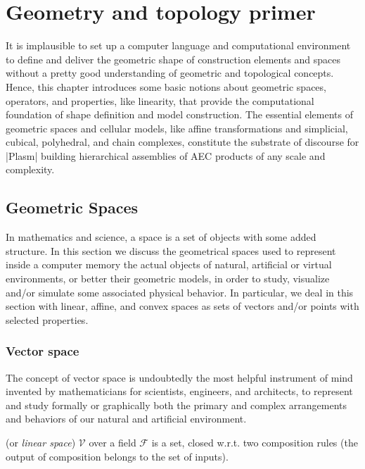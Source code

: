 
\chapter{Geometry and topology primer}
\label{chapt:3}

It is implausible to set up a computer language and computational environment to define and deliver the geometric shape of construction elements and spaces without a pretty good understanding of geometric and topological concepts. Hence, this chapter introduces some basic notions about geometric spaces, operators, and properties, like linearity, that provide the computational foundation of shape definition and model construction.
The essential elements of geometric spaces and cellular models, like affine transformations and simplicial, cubical, polyhedral, and chain complexes, constitute the substrate of discourse for |Plasm| building hierarchical assemblies of AEC products of any scale and complexity.

\section{Geometric Spaces}\label{chapt:3-1}


In mathematics and science, a space is a set of objects with some added structure.
In this section we discuss the geometrical spaces used to represent inside a computer memory the actual objects of natural, artificial or virtual environments, or better their geometric models, in order to study, visualize and/or simulate some associated physical behavior. 
In particular, we deal in this section with linear, affine, and convex spaces as sets of vectors and/or points with selected properties.

\subsection{Vector space}
\label{subsec:2:style}

The concept of vector space is undoubtedly the most helpful instrument of mind invented by mathematicians for scientists, engineers, and architects, to represent and study formally or graphically both the primary and complex arrangements and behaviors of our natural and artificial environment.

\begin{definition} (or \emph{linear space}) $\mathcal{V}$ over a field $\mathcal{F}$ is a set, closed w.r.t. two composition rules (the output of composition belongs to the set of inputs).
\end{definition}

